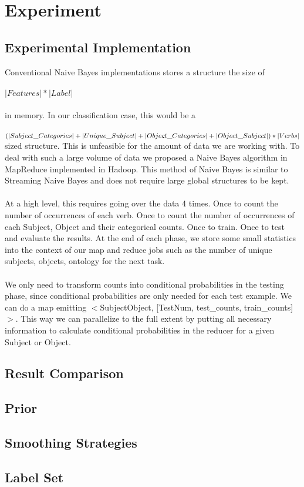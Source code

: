 \section{Experiment}

\subsection{Experimental Implementation}

Conventional Naive Bayes implementations stores a structure the size of \\
\\
$|Features| * |Label|$ \\
\\
in memory. In our classification case, this would be a \\
\\
$(|Subject\_Categories|+|Unique\_Subject|\\+|Object\_Categories|+|Object\_Subject|) * |Verbs|$ \\

sized structure. This is unfeasible for the amount of data we are working with. To deal with such a large volume of data we proposed a Naive Bayes algorithm in MapReduce implemented in Hadoop. This method of Naive Bayes is similar to Streaming Naive Bayes and does not require large global structures to be kept.\\
\\
At a high level, this requires going over the data 4 times. Once to count the number of occurrences of each verb. Once to count the number of occurrences of each Subject, Object and their categorical counts. Once to train. Once to test and evaluate the results. At the end of each phase, we store some small statistics into the context of our map and reduce jobs such as the number of unique subjects, objects, ontology for the next task.\\
\\
We only need to transform counts into conditional probabilities in the testing phase, since conditional probabilities are only needed for each test example. We can do a map emitting $<$Subject\/Object, [TestNum, test\_counts, train\_counts]$>$. This way we can parallelize to the full extent by putting all necessary information to calculate conditional probabilities in the reducer for a given Subject or Object. 

\subsection{Result Comparison}

\subsection{Prior}

\subsection{Smoothing Strategies}

\subsection{Label Set}



